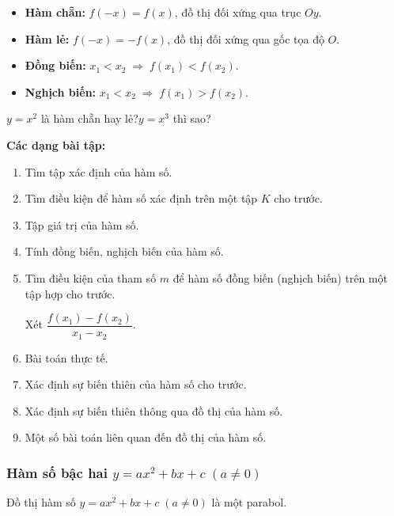 \documentclass[12pt,a4paper]{article}
\begin{document}
\begin{tinhchat}
  \begin{itemize}
    \item \textbf{Hàm chẵn:} $f(-x) = f(x)$, đồ thị đối xứng qua trục $Oy$.
    \item \textbf{Hàm lẻ:} $f(-x) = -f(x)$, đồ thị đối xứng qua gốc tọa độ $O$.
    \item \textbf{Đồng biến:} $x_1 < x_2 \;\Rightarrow\; f(x_1) < f(x_2)$.
    \item \textbf{Nghịch biến:} $x_1 < x_2 \;\Rightarrow\; f(x_1) > f(x_2)$.
  \end{itemize}
\end{tinhchat}

\begin{vidu}
  $y = x^2$ là hàm chẵn hay lẻ?\quad $y = x^3$ thì sao?
\end{vidu}

\medskip\noindent\textbf{Các dạng bài tập:}
\begin{enumerate}[label=\textbf{Dạng \arabic*:}, leftmargin=*, align=left]
  \item Tìm tập xác định của hàm số.
  \item Tìm điều kiện để hàm số xác định trên một tập $K$ cho trước.
  \item Tập giá trị của hàm số.
  \item Tính đồng biến, nghịch biến của hàm số.
  \item Tìm điều kiện của tham số $m$ để hàm số đồng biến (nghịch biến) trên một tập hợp cho trước.

    Xét $\dfrac{f(x_1) - f(x_2)}{x_1 - x_2}$.
  \item Bài toán thực tế.
  \item Xác định sự biến thiên của hàm số cho trước.
  \item Xác định sự biến thiên thông qua đồ thị của hàm số.
  \item Một số bài toán liên quan đến đồ thị của hàm số.
\end{enumerate}

\subsubsection{Hàm số bậc hai $y = ax^2 + bx + c\; (a \ne 0)$}

\begin{dinhnghia}
  Đồ thị hàm số $y = ax^2 + bx + c\; (a \ne 0)$ là một parabol.
\end{dinhnghia}
\end{document}
